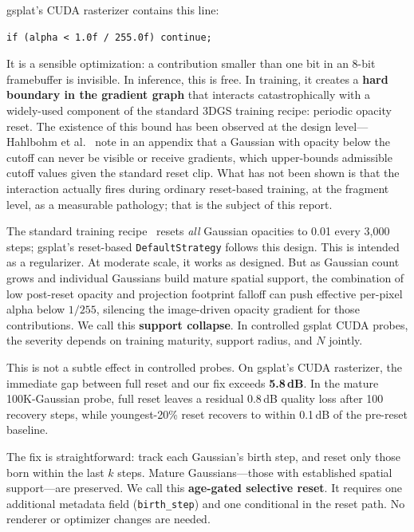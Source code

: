 \documentclass[runningheads]{llncs}
\newcommand{\DefaultStrategy}{\texttt{Default\allowbreak Strategy}}
\begin{document}
gsplat's CUDA rasterizer contains this line:

\begin{lstlisting}
if (alpha < 1.0f / 255.0f) continue;
\end{lstlisting}

It is a sensible optimization: a contribution smaller than one bit in an 8-bit framebuffer is invisible. In inference, this is free. In training, it creates a \textbf{hard boundary in the gradient graph} that interacts catastrophically with a widely-used component of the standard 3DGS training recipe: periodic opacity reset. The existence of this bound has been observed at the design level---Hahlbohm et al.~\cite{fastergs2026} note in an appendix that a Gaussian with opacity below the cutoff can never be visible or receive gradients, which upper-bounds admissible cutoff values given the standard reset clip. What has not been shown is that the interaction actually fires during ordinary reset-based training, at the fragment level, as a measurable pathology; that is the subject of this report.

The standard training recipe~\cite{kerbl2023} resets \emph{all} Gaussian opacities to 0.01 every 3{,}000 steps; gsplat's reset-based \DefaultStrategy{} follows this design. This is intended as a regularizer. At moderate scale, it works as designed. But as Gaussian count grows and individual Gaussians build mature spatial support, the combination of low post-reset opacity and projection footprint falloff can push effective per-pixel alpha below $1/255$, silencing the image-driven opacity gradient for those contributions. We call this \textbf{support collapse}. In controlled gsplat CUDA probes, the severity depends on training maturity, support radius, and $N$ jointly.

This is not a subtle effect in controlled probes. On gsplat's CUDA rasterizer, the immediate gap between full reset and our fix exceeds \textbf{5.8\,dB}. In the mature 100K-Gaussian probe, full reset leaves a residual 0.8\,dB quality loss after 100 recovery steps, while youngest-20\% reset recovers to within 0.1\,dB of the pre-reset baseline.

The fix is straightforward: track each Gaussian's birth step, and reset only those born within the last $k$ steps. Mature Gaussians---those with established spatial support---are preserved. We call this \textbf{age-gated selective reset}. It requires one additional metadata field (\texttt{birth\_step}) and one conditional in the reset path. No renderer or optimizer changes are needed.
\end{document}
